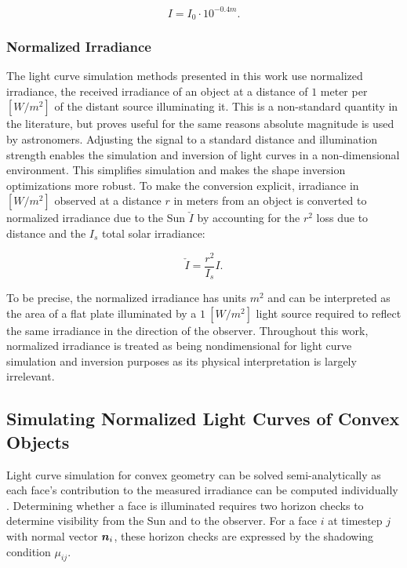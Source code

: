 \begin{equation} \label{eq:mag_to_irradiance}
  I = I_0 \cdot 10^{-0.4 m}.
\end{equation}

\subsubsection{Normalized Irradiance}

The light curve simulation methods presented in this work use normalized irradiance, the received irradiance of an object at a distance of $1$ meter per $\left[ W/m^2 \right]$ of the distant source illuminating it. This is a non-standard quantity in the literature, but proves useful for the same reasons absolute magnitude is used by astronomers. Adjusting the signal to a standard distance and illumination strength enables the simulation and inversion of light curves in a non-dimensional environment. This simplifies simulation and makes the shape inversion optimizations more robust. To make the conversion explicit, irradiance in $\left[ W/m^2 \right]$ observed at a distance $r$ in meters from an object is converted to normalized irradiance due to the Sun $\check{I}$ by accounting for the $r^2$ loss due to distance and the $I_s$ total solar irradiance:

\begin{equation} \label{eq:irradiance_to_norm_irradiance}
  \check{I} = \frac{r^2}{I_s} I.
\end{equation}

To be precise, the normalized irradiance has units $m^2$ and can be interpreted as the area of a flat plate illuminated by a $1 \: \left[W/m^2\right]$ light source required to reflect the same irradiance in the direction of the observer. Throughout this work, normalized irradiance is treated as being nondimensional for light curve simulation and inversion purposes as its physical interpretation is largely irrelevant.

\subsection{Simulating Normalized Light Curves of Convex Objects}

Light curve simulation for convex geometry can be solved semi-analytically as each face's contribution 
to the measured irradiance can be computed individually \cite{kaasalainen2001}. 
Determining whether a face is illuminated requires two horizon checks to determine visibility 
from the Sun and to the observer. For a face $i$ at timestep $j$ with normal vector $\bm{n}_i$, these horizon checks are expressed by the shadowing condition $\mu_{ij}$. 

